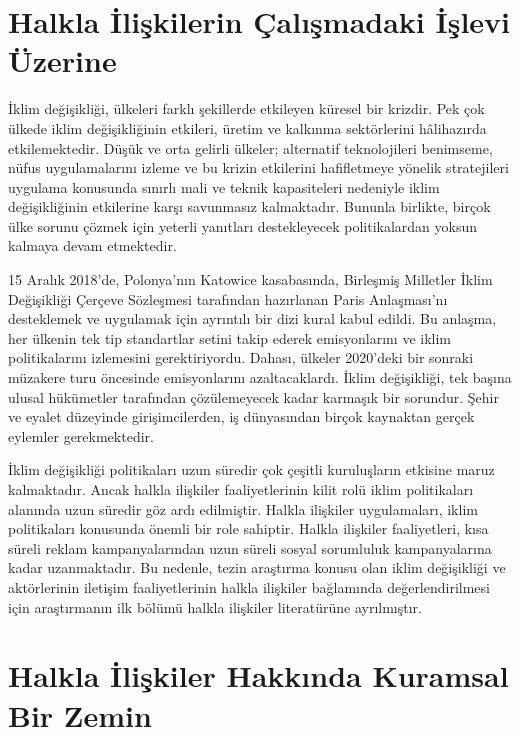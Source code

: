\documentclass[
]{book}
\begin{document}
\hypertarget{halkla-iliux15fkilerin-uxe7alux131ux15fmadaki-iux15flevi-uxfczerine}{%
\section{Halkla İlişkilerin Çalışmadaki İşlevi Üzerine}\label{halkla-iliux15fkilerin-uxe7alux131ux15fmadaki-iux15flevi-uxfczerine}}

İklim değişikliği, ülkeleri farklı şekillerde etkileyen küresel bir krizdir. Pek çok ülkede iklim değişikliğinin etkileri, üretim ve kalkınma sektörlerini hâlihazırda etkilemektedir. Düşük ve orta gelirli ülkeler; alternatif teknolojileri benimseme, nüfus uygulamalarını izleme ve bu krizin etkilerini hafifletmeye yönelik stratejileri uygulama konusunda sınırlı mali ve teknik kapasiteleri nedeniyle iklim değişikliğinin etkilerine karşı savunmasız kalmaktadır. Bununla birlikte, birçok ülke sorunu çözmek için yeterli yanıtları destekleyecek politikalardan yoksun kalmaya devam etmektedir. \citep{glasgow2018public}

15 Aralık 2018'de, Polonya'nın Katowice kasabasında, Birleşmiş Milletler İklim Değişikliği Çerçeve Sözleşmesi tarafından hazırlanan Paris Anlaşması'nı desteklemek ve uygulamak için ayrıntılı bir dizi kural kabul edildi. Bu anlaşma, her ülkenin tek tip standartlar setini takip ederek emisyonlarını ve iklim politikalarını izlemesini gerektiriyordu. Dahası, ülkeler 2020'deki bir sonraki müzakere turu öncesinde emisyonlarını azaltacaklardı. İklim değişikliği, tek başına ulusal hükümetler tarafından çözülemeyecek kadar karmaşık bir sorundur. Şehir ve eyalet düzeyinde girişimcilerden, iş dünyasından birçok kaynaktan gerçek eylemler gerekmektedir. \citep{dhanda2019climate}

İklim değişikliği politikaları uzun süredir çok çeşitli kuruluşların etkisine maruz kalmaktadır. Ancak halkla ilişkiler faaliyetlerinin kilit rolü iklim politikaları alanında uzun süredir göz ardı edilmiştir. Halkla ilişkiler uygulamaları, iklim politikaları konusunda önemli bir role sahiptir. Halkla ilişkiler faaliyetleri, kısa süreli reklam kampanyalarından uzun süreli sosyal sorumluluk kampanyalarına kadar uzanmaktadır.\citep{brulle2021role} Bu nedenle, tezin araştırma konusu olan iklim değişikliği ve aktörlerinin iletişim faaliyetlerinin halkla ilişkiler bağlamında değerlendirilmesi için araştırmanın ilk bölümü halkla ilişkiler literatürüne ayrılmıştır.

\hypertarget{halkla-iliux15fkiler-hakkux131nda-kuramsal-bir-zemin}{%
\section{Halkla İlişkiler Hakkında Kuramsal Bir Zemin}\label{halkla-iliux15fkiler-hakkux131nda-kuramsal-bir-zemin}}
\end{document}
